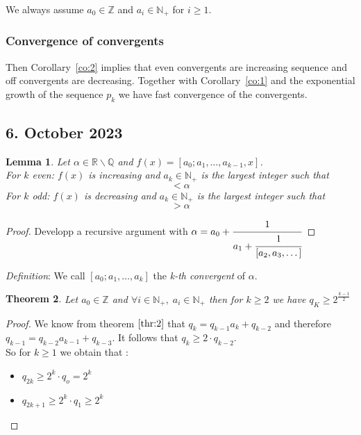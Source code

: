 \documentclass[a4paper,11pt,american]{article}
\newcommand{\N}{\mathbb{N}}
\newcommand{\Q}{\mathbb{Q}}
\newcommand{\R}{\mathbb{R}}
\newcommand{\Z}{\mathbb{Z}}
\theoremstyle{plain}
\newtheorem{theorem}{Theorem}
\newtheorem{lemma}[theorem]{Lemma}
\theoremstyle{definition}
\begin{document}
We always assume $a_0\in\Z$ and $a_i \in \N_+$ for $i\geq1$.





\subsubsection*{Convergence of convergents}

Then Corollary~\ref{co:2} implies that even convergents are increasing sequence and off convergents are decreasing. Together with Corollary~\ref{co:1} and the exponential growth of the sequence $p_k$ we have fast convergence of the convergents.



\subsection*{6. October 2023}
\begin{lemma}\label{lem:7}
Let $\alpha\in\R\backslash\Q$ and $f(x)=[a_0;a_1,\dots,a_{k-1},x]$.\\
For $k$ even: $f(x)$ is increasing and $a_k\in \N_+$ is the largest integer such that \begin{equation}
    [a_0;a_1,\dots,a_k]<\alpha
\end{equation}
For $k$ odd: $f(x)$ is decreasing and $a_k\in \N_+$ is the largest integer such that \begin{equation}
    [a_0;a_1,\dots,a_k]>\alpha
\end{equation}
\end{lemma}
\begin{proof}
    Developp a recursive argument with $\alpha=a_0+\cfrac{1}{a_1+\cfrac{1}{[a_2,a_3,\dots]}}$
\end{proof}
\emph{Definition}: We call $[a_0;a_1,\dots,a_k]$ the \emph{k-th convergent} of $\alpha$.
\begin{theorem}\label{th:8}
    Let $a_0\in\Z$ and $\forall i\in\N_+,\; a_i\in\N_+$ then for $k\geq 2$ we have $q_K\geq 2^{\frac{k-1}{2}}$
\end{theorem}
\begin{proof}
    We know from theorem $\eqref{thr:2}$ that $ q_ k =  q_{k-1} a_k + q_{k-2}$ and therefore $ q_ {k-1}  =  q_{k-2} a_{k-1} + q_{k-3}$. It follows that $q_k\geq 2\cdot q_{k-2}$.\\
    So for $k\geq 1$ we obtain that :\begin{itemize}
        \item $q_{2k}\geq 2^k\cdot q_o=2^k$
        \item $q_{2k+1}\geq 2^k\cdot q_1\geq 2^k$
    \end{itemize}
\end{proof}
\end{document}
